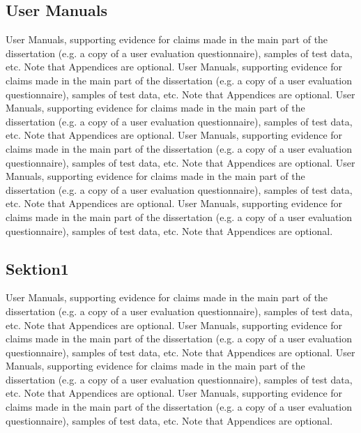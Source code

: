 \begin{appendices}


\chapter{User Manuals}
User Manuals, supporting evidence for claims made in the main part of the dissertation (e.g. a copy of a user evaluation questionnaire), samples of test data, etc. Note that Appendices are optional.
User Manuals, supporting evidence for claims made in the main part of the dissertation (e.g. a copy of a user evaluation questionnaire), samples of test data, etc. Note that Appendices are optional.
User Manuals, supporting evidence for claims made in the main part of the dissertation (e.g. a copy of a user evaluation questionnaire), samples of test data, etc. Note that Appendices are optional.
User Manuals, supporting evidence for claims made in the main part of the dissertation (e.g. a copy of a user evaluation questionnaire), samples of test data, etc. Note that Appendices are optional.
User Manuals, supporting evidence for claims made in the main part of the dissertation (e.g. a copy of a user evaluation questionnaire), samples of test data, etc. Note that Appendices are optional.
User Manuals, supporting evidence for claims made in the main part of the dissertation (e.g. a copy of a user evaluation questionnaire), samples of test data, etc. Note that Appendices are optional.
\section{Sektion1}
User Manuals, supporting evidence for claims made in the main part of the dissertation (e.g. a copy of a user evaluation questionnaire), samples of test data, etc. Note that Appendices are optional.
User Manuals, supporting evidence for claims made in the main part of the dissertation (e.g. a copy of a user evaluation questionnaire), samples of test data, etc. Note that Appendices are optional.
User Manuals, supporting evidence for claims made in the main part of the dissertation (e.g. a copy of a user evaluation questionnaire), samples of test data, etc. Note that Appendices are optional.
User Manuals, supporting evidence for claims made in the main part of the dissertation (e.g. a copy of a user evaluation questionnaire), samples of test data, etc. Note that Appendices are optional.

\end{appendices}
